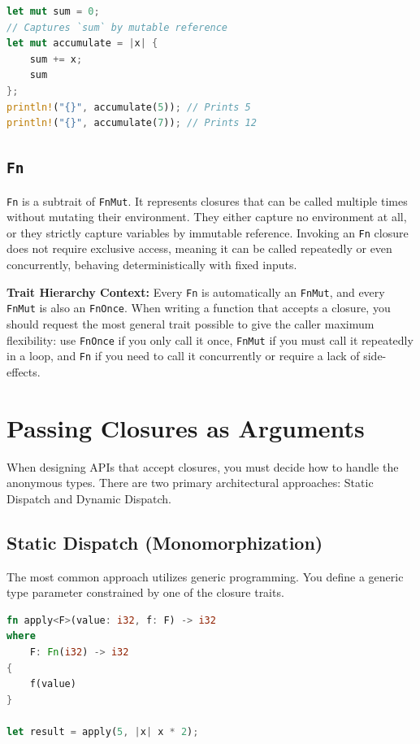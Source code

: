 \begin{lstlisting}[language=Rust]
let mut sum = 0;
// Captures `sum` by mutable reference
let mut accumulate = |x| {
    sum += x;
    sum
};
println!("{}", accumulate(5)); // Prints 5
println!("{}", accumulate(7)); // Prints 12
\end{lstlisting}

\subsection{\texttt{Fn}}
\texttt{Fn} is a subtrait of \texttt{FnMut}. It represents closures that can be called multiple times without mutating their environment. They either capture no environment at all, or they strictly capture variables by immutable reference. Invoking an \texttt{Fn} closure does not require exclusive access, meaning it can be called repeatedly or even concurrently, behaving deterministically with fixed inputs.

\begin{notebox}
\textbf{Trait Hierarchy Context:} 
Every \texttt{Fn} is automatically an \texttt{FnMut}, and every \texttt{FnMut} is also an \texttt{FnOnce}. When writing a function that accepts a closure, you should request the most general trait possible to give the caller maximum flexibility: use \texttt{FnOnce} if you only call it once, \texttt{FnMut} if you must call it repeatedly in a loop, and \texttt{Fn} if you need to call it concurrently or require a lack of side-effects.
\end{notebox}

\section{Passing Closures as Arguments}
When designing APIs that accept closures, you must decide how to handle the anonymous types. There are two primary architectural approaches: Static Dispatch and Dynamic Dispatch.

\subsection{Static Dispatch (Monomorphization)}
The most common approach utilizes generic programming. You define a generic type parameter constrained by one of the closure traits.

\begin{lstlisting}[language=Rust]
fn apply<F>(value: i32, f: F) -> i32 
where 
    F: Fn(i32) -> i32 
{
    f(value)
}

let result = apply(5, |x| x * 2);
\end{lstlisting}

